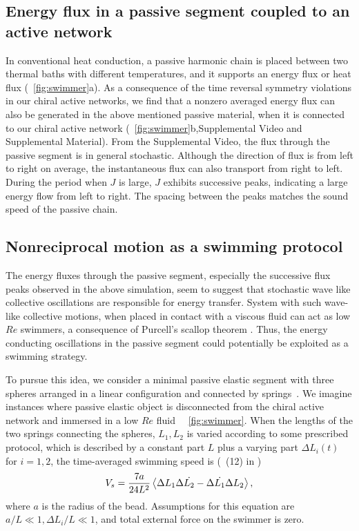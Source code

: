 \documentclass[
 preprint,
 preprintnumbers,
 amsmath,amssymb,
 aps,
 pre,
 longbibliography,
 superscriptaddress,
 10pt, twocolumn
]{revtex4-1}
\begin{document}
\subsection{Energy flux in a passive segment coupled to an active network}
In conventional heat conduction, a passive harmonic chain is placed between two thermal baths with different temperatures, and it supports an energy flux or heat flux (\figurename~\ref{fig:swimmer}a).
As a consequence of the time reversal symmetry violations in our chiral active networks, we find that a nonzero averaged energy flux can also be generated in the above mentioned passive material, when it is connected to our chiral active network (\figurename~\ref{fig:swimmer}b,Supplemental Video and Supplemental Material).
From the Supplemental Video, the flux through the passive segment is in general stochastic. Although the direction of flux is from left to right on average, the instantaneous flux can also transport from right to left. During the period when $J$ is large, $J$ exhibits successive peaks, indicating a large energy flow from left to right. The spacing between the peaks matches the sound speed of the passive chain.


\subsection{Nonreciprocal motion as a swimming protocol}
The energy fluxes through the passive segment, especially the successive flux peaks observed in the above simulation, seem to suggest that stochastic wave like collective oscillations are responsible for energy transfer. System with such wave-like collective motions, when placed in contact with a viscous fluid can act as low $Re$ swimmers, a consequence of Purcell's scallop theorem \cite{Taylor1951AnalysisSwimming,Golestanian2008AnalyticResults}. Thus, the energy conducting oscillations in the  passive segment could potentially be exploited as a swimming strategy.

To pursue this idea, we consider a minimal passive elastic segment with three spheres arranged in a linear configuration and connected by springs~\cite{Golestanian2008AnalyticResults}. We imagine instances where passive elastic object is disconnected from the chiral active network and immersed in a  low $Re$ fluid~ \figurename~\ref{fig:swimmer}. When the lengths of the two springs connecting the spheres, $L_1,L_2$ is varied according to some prescribed protocol, which is described by a constant part $L$ plus a varying part $\Delta L_i(t)$ for $i=1,2$, the time-averaged swimming speed is (\eqnname~(12) in \cite{Golestanian2008AnalyticResults})
\begin{equation} \label{eqn:swimmer_speed}
    V_s = \frac{7a}{24L^2} \expval{\Delta L_1 \Delta \Dot{L_2} - \Delta \Dot{L_1} \Delta{L_2}},
\end{equation}
where $a$ is the radius of the bead. Assumptions for this equation are $a/L \ll 1, \Delta L_i/L \ll 1$, and total external force on the swimmer is zero.
\end{document}
